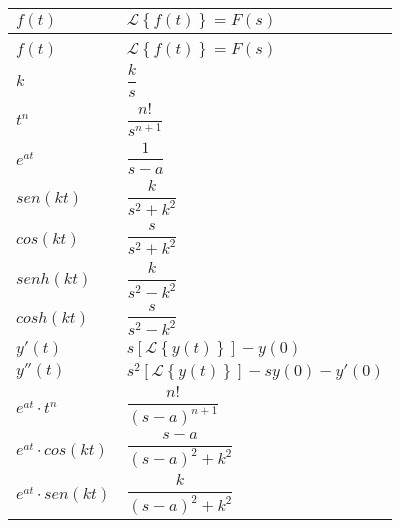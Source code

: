 \documentclass[12pt]{report}                                    %
\newcommand{\Vector}[1]{                                        %
        \ensuremath{\begin{matrix}#1\end{matrix}}                   %
    }
\newcommand{\LaplaceTransformation}[1]{                         %
        \mathscr{L} \left\{ #1 \right\}                             %
    }
\newcommand{\Laplace}[1]{                                      
        \LaplaceTransformation{#1}
    }
\begin{document}
        \begin{longtable}{p{60mm} || p{70mm}}
            \renewcommand{\arraystretch}{1.5}
            \Huge $f(t)$ & \Huge $\Laplace{f(t)} = F(s)$                                                            \\ [1.5ex] 
            \hline\hline                                                                                            \\
            \endfirsthead   
            \Huge $f(t)$ & \Huge $\Laplace{f(t)} = F(s)$                                                            \\ [1.5ex]
            \hline\hline                                                                   
            \endhead

            \Large $k$                               &\Large      $\dfrac{k}{s}$                                    \\ [3.0ex]
            \Large $t^n$                             &\Large      $\dfrac{n!}{s^{n+1}}$                             \\ [3.0ex]
            \Large $e^{at}$                          &\Large      $\dfrac{1}{s-a}$                                  \\ [3.0ex]
            \Large $sen(kt)$                         &\Large      $\dfrac{k}{s^2+k^2}$                              \\ [3.0ex]
            \Large $cos(kt)$                         &\Large      $\dfrac{s}{s^2+k^2}$                              \\ [3.0ex]
            \Large $senh(kt)$                        &\Large      $\dfrac{k}{s^2-k^2}$                              \\ [3.0ex]
            \Large $cosh(kt)$                        &\Large      $\dfrac{s}{s^2-k^2}$                              \\ [3.0ex]
            \Large $y'(t)$                           &\Large      $s[\Laplace{y(t)}] -y(0)$                         \\ [3.0ex]
            \Large $y''(t)$                          &\Large      $s^2[\Laplace{y(t)}] -sy(0) -y'(0)$               \\ [3.0ex]

            \Large $e^{at} \cdot t^n$                &\Large      $\dfrac{n!}{(s-a)^{n+1}}$                         \\ [3.0ex]
            \Large $e^{at} \cdot cos(kt)$            &\Large      $\dfrac{s-a}{(s-a)^2+k^2}$                        \\ [3.0ex]
            \Large $e^{at} \cdot sen(kt)$            &\Large      $\dfrac{k}{(s-a)^2+k^2}$                          \\ [3.0ex]


 
        \end{longtable}
\end{document}

